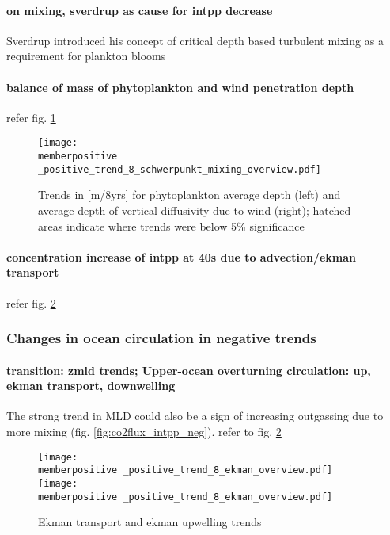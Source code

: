 \documentclass[12pt]{article}
\newcommand{\memberpositive}{m178_1985_1992} %
\begin{document}
\paragraph{on mixing, sverdrup as cause for intpp decrease} 
Sverdrup \citep{Sverdrup1953} introduced his concept of critical depth based turbulent mixing as a requirement for plankton blooms \citep{Franks2014}

\paragraph{balance of mass of phytoplankton and wind penetration depth}
refer fig. \ref{fig:wind_mixing_neg} 

\begin{figure}[h!]
	\centering
	\texttt{[image: \\memberpositive \_positive\_trend\_8\_schwerpunkt\_mixing\_overview.pdf]}
	\caption{Trends in [m/8yrs] for phytoplankton average depth (left) and average depth of vertical diffusivity due to wind (right); hatched areas indicate where trends were below 5\% significance}
	\label{fig:wind_mixing_neg}
\end{figure}


\paragraph{concentration increase of intpp at 40s due to advection/ekman transport} refer fig. \ref{fig:ekman_neg}



\clearpage



\subsubsection{Changes in ocean circulation in negative trends}

\paragraph{transition: zmld trends; Upper-ocean overturning circulation: up, ekman transport, downwelling} The strong trend in MLD could also be a sign of increasing outgassing due to more mixing (fig. \ref{fig:co2flux_intpp_neg}). refer to fig. \ref{fig:ekman_neg}

\begin{figure}[h!]
	\centering
	\texttt{[image: \\memberpositive \_positive\_trend\_8\_ekman\_overview.pdf]}
	\texttt{[image: \\memberpositive \_positive\_trend\_8\_ekman\_overview.pdf]}
	\caption{Ekman transport and ekman upwelling trends}
	\label{fig:ekman_neg}
\end{figure}
\end{document}
